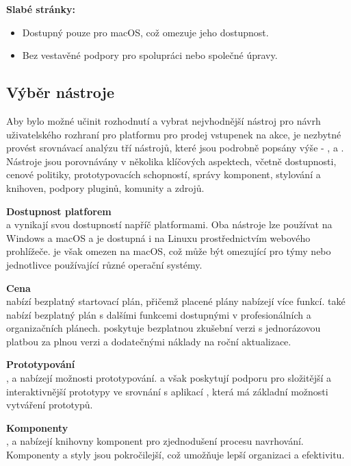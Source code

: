 \textbf{Slabé stránky:}
\begin{itemize}
    \item Dostupný pouze pro macOS, což omezuje jeho dostupnost.
    \item Bez vestavěné podpory pro spolupráci nebo společné úpravy.
\end{itemize}

\subsection{Výběr nástroje}
\label{subsec:navrh-ui-nastroje-vyber}
Aby bylo možné učinit rozhodnutí a vybrat nejvhodnější nástroj pro návrh uživatelského rozhraní pro platformu pro prodej vstupenek na akce, je nezbytné provést srovnávací analýzu tří nástrojů, které jsou podrobně popsány výše - ,  a .
Nástroje jsou porovnávány v několika klíčových aspektech, včetně dostupnosti, cenové politiky, prototypovacích schopností, správy komponent, stylování a knihoven, podpory pluginů, komunity a zdrojů.

\textbf{Dostupnost platforem}\\
 a  vynikají svou dostupností napříč platformami.
Oba nástroje lze používat na Windows a macOS a  je dostupná i na Linuxu prostřednictvím webového prohlížeče.
 je však omezen na macOS, což může být omezující pro týmy nebo jednotlivce používající různé operační systémy.

\textbf{Cena}\\
 nabízí bezplatný startovací plán, přičemž placené plány nabízejí více funkcí.
 také nabízí bezplatný plán s dalšími funkcemi dostupnými v profesionálních a organizačních plánech.
 poskytuje bezplatnou zkušební verzi s jednorázovou platbou za plnou verzi a dodatečnými náklady na roční aktualizace.

\textbf{Prototypování}\\
,  a  nabízejí možnosti prototypování.
 a  však poskytují podporu pro složitější a interaktivnější prototypy ve srovnání s aplikací , která má základní možnosti vytváření prototypů.

\textbf{Komponenty}\\
,  a  nabízejí knihovny komponent pro zjednodušení procesu navrhování.
Komponenty a styly  jsou pokročilejší, což umožňuje lepší organizaci a efektivitu.

